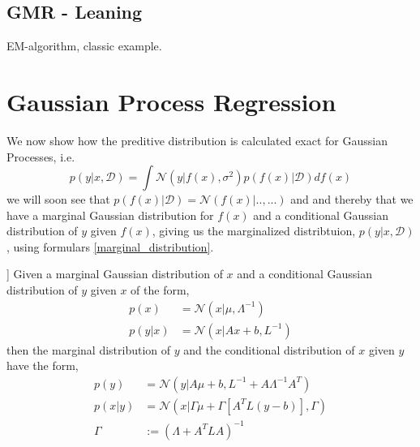 \subsection{GMR - Leaning}

EM-algorithm, classic example. 

\section{Gaussian Process Regression}
We now show how the preditive distribution is calculated exact for
Gaussian Processes, i.e. 
\begin{equation}\label{GP_predictive}
    p(y|x,\mathcal{D}) = \int \mathcal{N}(y|f(x), \sigma^2) p(f(x)|\mathcal{D})df(x)
\end{equation}
we will soon see that $p(f(x)|\mathcal{D}) = \mathcal{N}(f(x)| .., ...)$ and
and thereby that we have a marginal Gaussian distribution for $f(x)$ and a 
conditional Gaussian distribution of $y$ given $f(x)$, giving us the marginalized
distribtuion, $p(y|x,\mathcal{D})$, using formulars \eqref{marginal_distribution}. 

\begin{testexample2}[Trick with normal distributions [from Bishops book?]]
    Given a marginal Gaussian distribution of $x$ and a conditional Gaussian distribution
    of $y$ given $x$ of the form, 
    \begin{align*}
        p(x) &= \mathcal{N}(x|\mu, \Lambda^{-1})\\
        p(y|x) &= \mathcal{N}(x|Ax+b, L^{-1})
    \end{align*}
    then the marginal distribution of $y$ and the conditional distribution of $x$ given $y$
    have the form, 
    \begin{align}
        p(y) &= \mathcal{N}(y|A\mu+b,L^{-1}+A \Lambda^{-1}A^T) \label{marginal_distribution}\\
        p(x|y) &= \mathcal{N}(x|\Gamma \mu+\Gamma [A^TL(y-b)],\Gamma )\\
        \Gamma &:= (\Lambda +A^TLA)^{-1}
    \end{align}
\end{testexample2}

